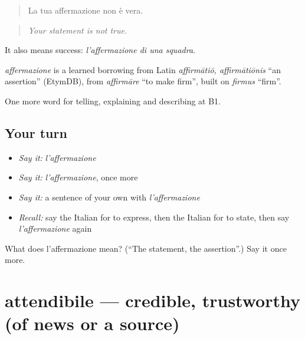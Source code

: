 \begin{quote}
La tua affermazione non è vera.
\end{quote}

\begin{quote}
\emph{Your statement is not true.}
\end{quote}

It also means success: \emph{l'affermazione di una squadra}.

\begin{cousinweb}
\emph{affermazione} is a learned borrowing from Latin \emph{affirmātiō, affirmātiōnis} \textquotedblleft{}an assertion\textquotedblright{} (EtymDB), from \emph{affirmāre} \textquotedblleft{}to make firm\textquotedblright{}, built on \emph{firmus} \textquotedblleft{}firm\textquotedblright{}.
\end{cousinweb}

\begin{grammarlens}[title={What you've built}]
One more word for telling, explaining and describing at B1.
\end{grammarlens}

\subsection*{Your turn}
\begin{itemize}
\raggedright
  \item \emph{Say it:} \emph{l'affermazione}
  \item \emph{Say it:} \emph{l'affermazione}, once more
  \item \emph{Say it:} a sentence of your own with \emph{l'affermazione}
  \item \emph{Recall:} say the Italian for to express, then the Italian for to state, then say \emph{l'affermazione} again
\end{itemize}

\begin{tcolorbox}[breakable,colback=teal!4,colframe=teal!35!black,title={Before you move on}]
What does l'affermazione mean? (\textquotedblleft{}The statement, the assertion\textquotedblright{}.) Say it once more.
\end{tcolorbox}
\section[attendibile]{attendibile — credible, trustworthy (of news or a source)}

\label{lesson:IT-C345-attendibile}



